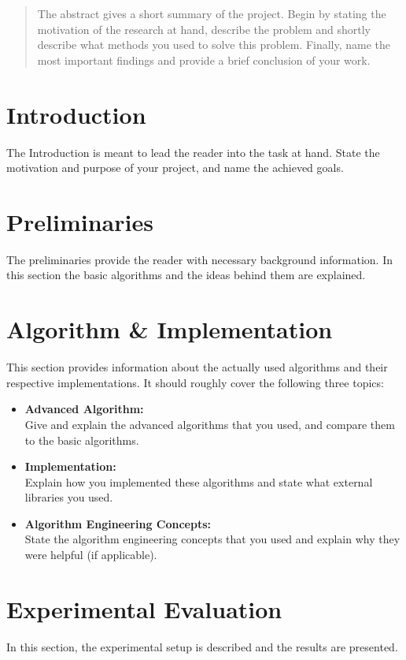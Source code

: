 \documentclass[twocolumn]{article}
\begin{document}


\begin{abstract}
    The abstract gives a short summary of the project. Begin by stating the motivation of the research at hand, describe the problem and shortly describe what methods you used to solve this problem. Finally, name the most important findings and provide a brief conclusion of your work.
\end{abstract}


\section{Introduction}
The Introduction is meant to lead the reader into the task at hand. State the motivation and purpose of your project, and name the achieved goals.

\section{Preliminaries}
The preliminaries provide the reader with necessary background information. In this section the basic algorithms and the ideas behind them are explained.

\section{Algorithm \& Implementation}
This section provides information about the actually used algorithms and their respective implementations. It should roughly cover the following three topics:
\begin{itemize}
	\item \textbf{Advanced Algorithm:}\\
		Give and explain the advanced algorithms that you used, and compare them to the basic algorithms.
	\item \textbf{Implementation:}\\
		Explain how you implemented these algorithms and state what external libraries you used.
	\item \textbf{Algorithm Engineering Concepts:}\\
		State the algorithm engineering concepts that you used and explain why they were helpful (if applicable).
\end{itemize}

\section{Experimental Evaluation}
In this section, the experimental setup is described and the results are presented.
\end{document}
